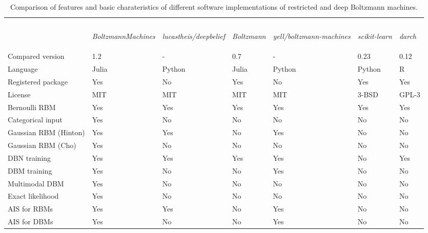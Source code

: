 \documentclass[12pt]{article}
\newcommand{\apkg}[1]{\emph{#1}}
\begin{document}
\begin{table}[h!]
\centering
\caption{\label{tab:FeatureOverviewBoltzmann} Comparison of features and basic charateristics of different software implementations of restricted and deep Boltzmann machines.}
\begin{tabular}{p{4.4cm} p{1.1cm} p{1.1cm} p{1.1cm} p{1.1cm} p{1.25cm} p{1.25cm}}
\hline \\ [3.9ex]\\
 & \begin{rotate}{25}\apkg{BoltzmannMachines} \end{rotate} & 
 \begin{rotate}{25} \apkg{lucastheis/deepbelief} \end{rotate} & 
 \begin{rotate}{25} \apkg{Boltzmann} \end{rotate} & 
 \begin{rotate}{25} \apkg{yell/boltzmann-machines}  \end{rotate} &
 \begin{rotate}{25} \apkg{scikit-learn} \end{rotate} &
 \begin{rotate}{25} \apkg{darch} \end{rotate} \\
\hline
Compared version & 1.2 & - & 0.7 & - & 0.23 & 0.12 \\
Language & Julia & Python & Julia & Python & Python & R \\
Registered package & Yes & No & Yes & No & Yes & Yes \\ 
License & MIT & MIT & MIT & MIT & 3-BSD & GPL-3 \\ 
Bernoulli RBM & Yes & Yes & Yes  & Yes & Yes & Yes \\
Categorical input & Yes & No & No & No & No & No \\
Gaussian RBM (Hinton) & Yes & Yes & No & Yes & No & No \\
Gaussian RBM (Cho) & Yes & No & No & No & No & No \\
DBN training & Yes & Yes & Yes & Yes & No & Yes \\
DBM training & Yes & No & No & Yes & No & No \\
Multimodal DBM & Yes & No & No & No & No & No \\
Exact likelihood & Yes & No & No & No & No & No \\
AIS for RBMs & Yes & Yes & No & Yes & No & No \\
AIS for DBMs & Yes & No & No & Yes & No & No \\
\hline
\end{tabular}
\end{table}
\end{document}
